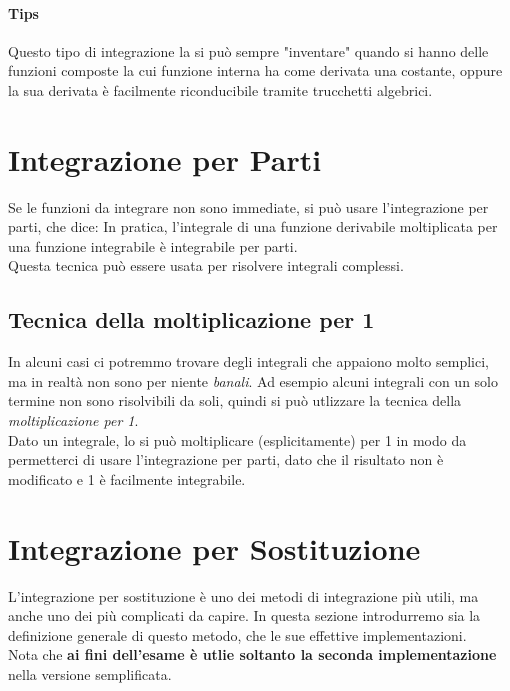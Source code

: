 \paragraph*{Tips}
Questo tipo di integrazione la si può sempre "inventare" quando si hanno delle funzioni composte la cui funzione interna ha come derivata una costante,
oppure la sua derivata è facilmente riconducibile tramite trucchetti algebrici.

\section{Integrazione per Parti}
Se le funzioni da integrare non sono immediate, si può usare l'integrazione per parti, che dice:
In pratica, l'integrale di una funzione derivabile moltiplicata per una funzione integrabile è integrabile per parti.
\\Questa tecnica può essere usata per risolvere integrali complessi.

\subsection*{Tecnica della moltiplicazione per 1}
In alcuni casi ci potremmo trovare degli integrali che appaiono molto semplici, ma in realtà non sono per niente \emph{banali}.
Ad esempio alcuni integrali con un solo termine non sono risolvibili da soli, quindi si può utlizzare la tecnica della \emph{moltiplicazione per 1}.
\\Dato un integrale, lo si può moltiplicare (esplicitamente) per 1 in modo da permetterci di usare l'integrazione per parti, dato che il risultato non è modificato e 1 è facilmente integrabile.

\section{Integrazione per Sostituzione}
L'integrazione per sostituzione è uno dei metodi di integrazione più utili, ma anche uno dei più complicati da capire.
In questa sezione introdurremo sia la definizione generale di questo metodo, che le sue effettive implementazioni.
\\Nota che \textbf{ai fini dell'esame è utlie soltanto la seconda implementazione} nella versione semplificata.

